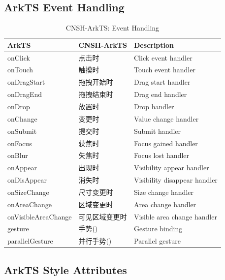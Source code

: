 \subsection{ArkTS Event Handling}

\begin{table}[h]
\centering
\caption{CNSH-ArkTS: Event Handling}
\renewcommand{\arraystretch}{1.3}
\begin{tabular}{llp{5cm}}
\toprule
\textbf{ArkTS} & \textbf{CNSH-ArkTS} & \textbf{Description} \\
\midrule
onClick & 点击时 & Click event handler \\
onTouch & 触摸时 & Touch event handler \\
onDragStart & 拖拽开始时 & Drag start handler \\
onDragEnd & 拖拽结束时 & Drag end handler \\
onDrop & 放置时 & Drop handler \\
onChange & 变更时 & Value change handler \\
onSubmit & 提交时 & Submit handler \\
onFocus & 获焦时 & Focus gained handler \\
onBlur & 失焦时 & Focus lost handler \\
onAppear & 出现时 & Visibility appear handler \\
onDisAppear & 消失时 & Visibility disappear handler \\
onSizeChange & 尺寸变更时 & Size change handler \\
onAreaChange & 区域变更时 & Area change handler \\
onVisibleAreaChange & 可见区域变更时 & Visible area change handler \\
gesture & 手势() & Gesture binding \\
parallelGesture & 并行手势() & Parallel gesture \\
\bottomrule
\end{tabular}
\end{table}

\subsection{ArkTS Style Attributes}


